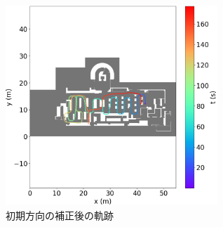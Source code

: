 \documentclass[Japanese]{dicomopapers}
\begin{document}
\begin{figure}[h]
	\centering
	\includegraphics[width=80mm]{image/pdr-rotate.jpg}
	\caption{初期方向の補正後の軌跡}    \label{}
\end{figure}









\end{document}
